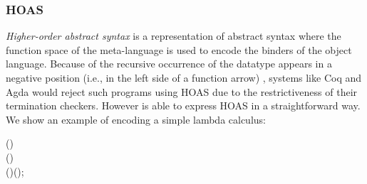 \subsubsection{HOAS}

\emph{Higher-order abstract syntax} is a representation of abstract
syntax where the function space of the meta-language is used to encode
the binders of the object language. Because of the recursive
occurrence of the datatype appears in a negative position (i.e., in
the left side of a function arrow) 
, systems like Coq and Agda would reject such programs using
HOAS due to the restrictiveness of their termination checkers. However
\sufcc is able to express HOAS in a straightforward way. We show an
example of encoding a simple lambda calculus:
\begin{hscode}\SaveRestoreHook
{}%
%
%
%
%
%
\>[3]{}\;\mathrel{=}\;(\mathbin{:}){}\<[E]%
\\
\>[3]{}\<[5]%
\>[5]{}\mid {}\<[5E]%
\>[8]{}\;(\mathbin{:}\to {}){}\<[E]%
\\
\>[3]{}\<[5]%
\>[5]{}\mid {}\<[5E]%
\>[8]{}\;(\mathbin{:})\;(\mathbin{:});{}\<[E]%
\ColumnHook
\end{hscode}\resethooks

